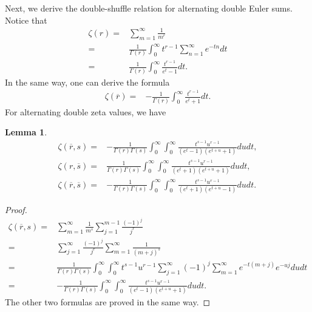 \documentclass[reqno]{amsart}
\newtheorem{lemma}[theorem]{Lemma}
\theoremstyle{definition}
\theoremstyle{remark}
\numberwithin{equation}{section}
\begin{document}
Next, we derive the double-shuffle relation for alternating double Euler sums.
Notice that
\begin{align*}
\zeta(r)=&\sum_{m=1}^{\infty}\frac{1}{m^r}\\
=&\frac{1}{\Gamma(r)}\int_0^{\infty} t^{r-1}\sum_{n=1}^{\infty} e^{-tn}dt\\
=&\frac{1}{\Gamma(r)}\int_0^{\infty}\frac{t^{r-1}}{e^t-1}dt.
\end{align*}
In the same way, one can derive the formula
\begin{align*}
\zeta(\overline{r})=& -\frac{1}{\Gamma(r)}\int_0^{\infty}\frac{t^{r-1}}{e^t+1}dt.
\end{align*}For alternating double zeta values, we have
\begin{lemma}\label{lemma5}
\begin{align}
\zeta(\overline{r}, s)=&-\frac{1}{\Gamma(r)\Gamma(s)}\int_0^{\infty}\int_0^{\infty}\frac{t^{s-1}u^{r-1}}{(e^t-1)(e^{t+u}+1) }dudt,\label{eq19}\\
\zeta\left(r, \overline{s} \right)=&\frac{1}{\Gamma(r)\Gamma(s)}\int_0^{\infty}\int_0^{\infty}\frac{t^{s-1}u^{r-1}}{(e^t+1)(e^{t+u}+1) }dudt,\label{eq20}\\
\zeta\left(\overline{r}, \overline{s} \right)=&-\frac{1}{\Gamma(r)\Gamma(s)}\int_0^{\infty}\int_0^{\infty}\frac{t^{s-1}u^{r-1}}{(e^t+1)(e^{t+u}-1) }dudt.\label{eq21}
\end{align}
\end{lemma}
\begin{proof}
\begin{align*}
\zeta\left(\overline{r}, s\right)=&\sum_{m=1}^{\infty} \frac{1}{m^s}\sum_{j=1}^{m-1}\frac{(-1)^j}{j^r}\\
=&\sum_{j=1}^{\infty}\frac{(-1)^j}{j^r}\sum_{m=1}^{\infty} \frac{1}{(m+j)^s}\\
=&\frac{1}{\Gamma(r)\Gamma(s)}\int_0^{\infty}\int_0^{\infty}t^{s-1}u^{r-1} \sum_{j=1}^{\infty}(-1)^j\sum_{m=1}^{\infty} e^{-t(m+j)}e^{-uj}dudt\\
=&-\frac{1}{\Gamma(r)\Gamma(s)}\int_0^{\infty}\int_0^{\infty}\frac{t^{s-1}u^{r-1}}{(e^t-1)(e^{t+u}+1) }dudt.
\end{align*}
The other two formulas are proved in the same way.
\end{proof}
\end{document}
